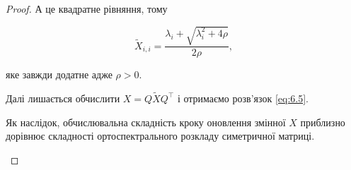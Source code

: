 \begin{proof}
    А це квадратне рівняння, тому
    
    \begin{equation}
        \tilde X_{i,i} = \frac{\lambda_i + \sqrt{\lambda_i^2 + 4 \rho}}{2 \rho},
    \end{equation}
    
    яке завжди додатне адже $\rho > 0$. \medskip
    
    Далі лишається обчислити $X = Q \tilde X Q^\intercal$ і отримаємо розв'язок \eqref{eq:6.5}. 
    
    \begin{remark}
        Як наслідок, обчислювальна складність кроку оновлення змінної $X$ приблизно дорівнює складності ортоспектрального розкладу симетричної матриці.
    \end{remark}
\end{proof}
